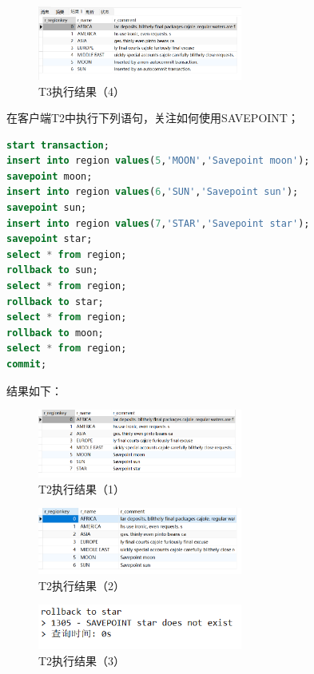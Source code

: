 \documentclass{article}
\begin{document}
\begin{figure}[H]
  \centering
  \includegraphics[width=0.6\textwidth]{img/24.png}
  \caption{T3执行结果（4）}
\end{figure}

在客户端T2中执行下列语句，关注如何使用SAVEPOINT；

\begin{lstlisting}[language=sql]
start transaction;
insert into region values(5,'MOON','Savepoint moon');
savepoint moon;
insert into region values(6,'SUN','Savepoint sun');
savepoint sun;
insert into region values(7,'STAR','Savepoint star');
savepoint star;
select * from region;
rollback to sun;
select * from region;
rollback to star;
select * from region;
rollback to moon;
select * from region;
commit;
\end{lstlisting}

结果如下：

\begin{figure}[H]
  \centering
  \includegraphics[width=0.6\textwidth]{img/25.png}
  \caption{T2执行结果（1）}
\end{figure}

\begin{figure}[H]
  \centering
  \includegraphics[width=0.6\textwidth]{img/26.png}
  \caption{T2执行结果（2）}
\end{figure}

\begin{figure}[H]
  \centering
  \includegraphics[width=0.6\textwidth]{img/27.png}
  \caption{T2执行结果（3）}
\end{figure}
\end{document}
